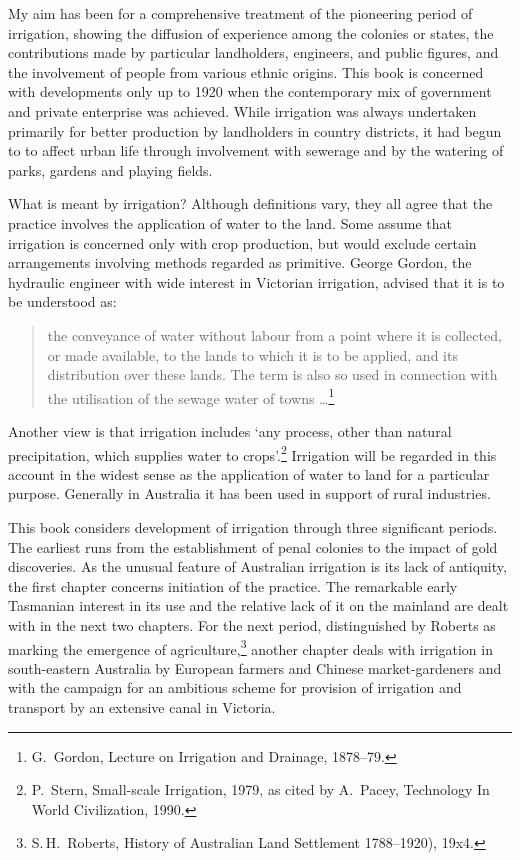 My aim has been for a comprehensive treatment of the pioneering period
of irrigation, showing the diffusion of experience among the colonies
or states, the contributions made by particular landholders,
engineers, and public figures, and the involvement of people from
various ethnic origins.  This book is concerned with developments only
up to 1920 when the contemporary mix of government and private
enterprise was achieved.  While irrigation was always undertaken
primarily for better production by landholders in country districts,
it had begun to to affect urban life through involvement with sewerage
and by the watering of parks, gardens and playing fields.

What is meant by irrigation?  Although definitions vary, they all
agree that the practice involves the application of water to the land.
Some assume that irrigation is concerned only with crop production,
but would exclude certain arrangements involving methods regarded as
primitive.  George Gordon, the hydraulic engineer with wide interest
in Victorian irrigation, advised that it is to be understood as:
\begin{quote}
	the conveyance of water without labour from a point where it
	is collected, or made available, to the lands to which it is
	to be applied, and its distribution over these lands. The term
	is also so used in connection with the utilisation of the
	sewage water of towns \ldots\footnote{G.~Gordon, Lecture on
	Irrigation and Drainage, 1878--79.}
\end{quote}
Another view is that irrigation includes `any process, other than
natural precipitation, which supplies water to
crops'.\footnote{P.~Stern, Small-scale Irrigation, 1979, as cited by
A.~Pacey, Technology In World Civilization, 1990.}  Irrigation will be
regarded in this account in the widest sense as the application of
water to land for a particular purpose.  Generally in Australia it has
been used in support of rural industries.

This book considers development of irrigation through three
significant periods.  The earliest runs from the establishment of
penal colonies to the impact of gold discoveries.  As the unusual
feature of Australian irrigation is its lack of antiquity, the first
chapter concerns initiation of the practice.  The remarkable early
Tasmanian interest in its use and the relative lack of it on the
mainland are dealt with in the next two chapters.  For the next
period, distinguished by Roberts as marking the emergence of
agriculture,\footnote{S.\,H.~Roberts, History of Australian Land
Settlement 1788--1920), 19x4.}  another chapter deals with irrigation
in south-eastern Australia by European farmers and Chinese
market-gardeners and with the campaign for an ambitious scheme for
provision of irrigation and transport by an extensive canal in
Victoria.

